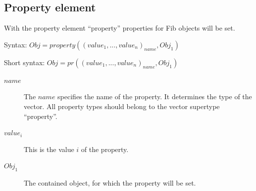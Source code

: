 

\subsection{Property element}
\label{fibProperty}\label{secFibProperty}

With the property element ``property'' properties for Fib objects will be set.

\bigskip\noindent
Syntax:
$Obj = property( ( value_1, ..., value_n)_{name}, Obj_1 ) $

\bigskip\noindent
Short syntax:
$Obj = pr( (value_1, ..., value_n)_{name}, Obj_1 )$

\begin{description}
 \item[$name$] The $name$ specifies the name of the property. It determines the type of the vector. All property types should belong to the vector supertype ``property''.
 \item[$value_i$] This is the value $i$ of the property.
 \item[$Obj_1$] The contained object, for which the property will be set.
\end{description}


